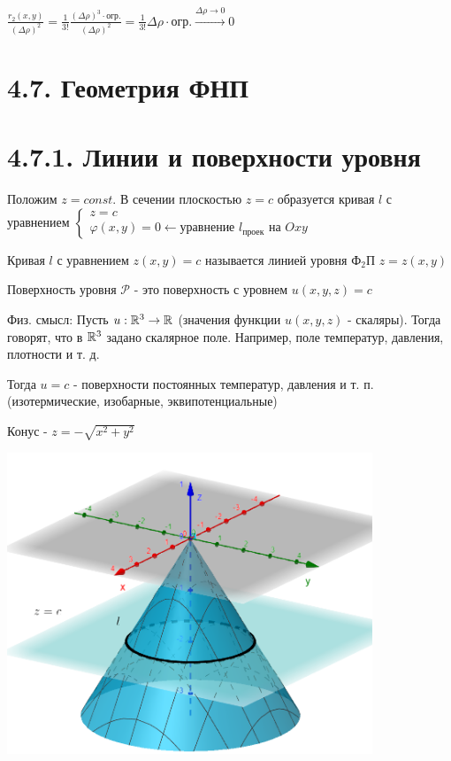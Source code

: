 \documentclass[12pt]{article}
\begin{document}
    $\frac{r_2(x, y)}{(\Delta \rho)^2} = \frac{1}{3!} \frac{(\Delta \rho)^3 \cdot \text{огр.}}{(\Delta \rho)^2} = \frac{1}{3!} \Delta \rho \cdot \text{огр.} \stackrel{\Delta \rho \to 0}{\rightarrow} 0$

    \section{4.7. Геометрия ФНП}


    \section{4.7.1. Линии и поверхности уровня}

    Положим $z = const$. В сечении плоскостью $z = c$ образуется кривая $l$ с уравнением $\begin{cases}z = c \\ \varphi(x, y) = 0 \leftarrow \text{уравнение $l_\text{проек}$ на $Oxy$}\end{cases}$

    Кривая $l$ с уравнением $z(x, y) = c$ называется линией уровня Ф$_2$П $z = z(x, y)$

    \Def Поверхность уровня $\mathcal{P}$ - это поверхность с уровнем $u(x, y, z) = c$

    Физ. смысл: Пусть $u : \mathbb{R}^3 \rightarrow \mathbb{R}$ (значения функции $u(x, y, z)$ - скаляры). Тогда говорят, что в $\mathbb{R}^3$ задано скалярное поле. Например, поле температур, давления, плотности и т. д.

    Тогда $u = c$ - поверхности постоянных температур, давления и т. п. (изотермические, изобарные, эквипотенциальные)

    \Ex Конус - $z = -\sqrt{x^2 + y^2}$

    \includegraphics[height=90mm]{images/calculus_2024_03_13_1}
\end{document}
